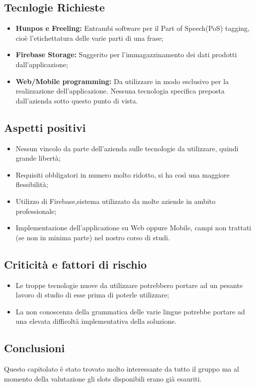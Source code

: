 \subsection{Tecnlogie Richieste}
\begin{itemize}
	\item \textbf{Hunpos e Freeling: } Entrambi software per il Part of Speech(PoS) tagging, cioè l'etichettatura delle varie parti di una frase;
	\item \textbf{Firebase Storage: }Suggerito per l'immagazzinamento dei dati prodotti dall'applicazione;
	\item \textbf{Web/Mobile programming: }Da utilizzare in modo esclusivo per la realizzazione dell'applicazione. Nessuna tecnologia specifica preposta dall'azienda sotto questo punto di vista.
\end{itemize}
\subsection{Aspetti positivi}
\begin{itemize}
	\item Nessun vincolo da parte dell'azienda sulle tecnologie da utilizzare, quindi grande libertà;
	\item Requisiti obbligatori in numero molto ridotto, si ha così una maggiore flessibilità;
	\item Utilizzo di Firebase,sistema utilizzato da molte aziende in ambito professionale;
	\item Implementazione dell'applicazione su Web oppure Mobile, campi non trattati (se non in minima parte) nel nostro corso di studi. 
\end{itemize}
\subsection{Criticità e fattori di rischio}
\begin{itemize}
\item Le troppe tecnologie nuove da utilizzare potrebbero portare ad un pesante lavoro di studio di esse prima di poterle utilizzare;
\item La non conoscenza della grammatica delle varie lingue potrebbe portare ad una elevata difficoltà implementativa della soluzione.
\end{itemize}
\subsection{Conclusioni}
Questo capitolato è stato trovato molto interessante da tutto il gruppo ma al momento della valutazione gli slots disponibili erano già esauriti.